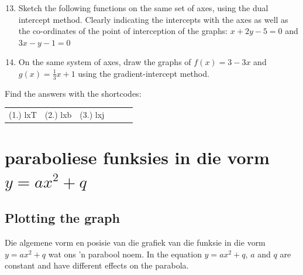\begin{exercises}{}
{\begin{figure}[H]
\end{figure}  
            
\begin{enumerate}[noitemsep, label=\textbf{\arabic*}. ] 
\setcounter{enumi}{12}
\item Sketch the following functions on the same set of axes, using the dual intercept method. Clearly indicating the intercepts with the axes as well as the co-ordinates of the point of interception of the graphs: $x+2y-5=0$ and $3x-y-1=0$
\item On the same system of axes, draw the graphs of $f(x)=3-3x$ and $g(x)=\frac{1}{3}x+1$ using the gradient-intercept method.
\end{enumerate}

\par {} Find the answers with the shortcodes:
\par \begin{tabular}[h]{cccccc}
(1.) lxT  &  (2.) lxb  &  (3.) lxj  & \end{tabular}
}
\end{exercises}
   

\section{paraboliese funksies in die vorm $y=a{x}^{2}+q$}
\subsection*{Plotting the graph}         
Die algemene vorm en posisie van die grafiek van die funksie in die vorm $y=a{x}^{2}+q$  wat ons ’n parabool noem. In the equation $y=a{x}^{2}+q$, $a$ and $q$ are constant and have different effects on the parabola. 

